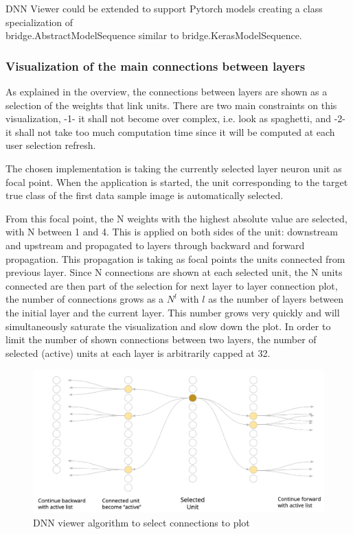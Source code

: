 DNN Viewer could be extended to support Pytorch models creating a class specialization of \\
bridge.AbstractModelSequence similar to bridge.KerasModelSequence.


\subsubsection{Visualization of the main connections between layers}
\label{sec-dnnviewer-implementation-topn-connections}

As explained in the overview, the connections between layers are shown as a selection of the weights that link units. There are two main constraints on this visualization, -1- it shall not become over complex, i.e. look as spaghetti, and -2- it shall not take too much computation time since it will be computed at each user selection refresh.

The chosen implementation is taking the currently selected layer neuron unit as focal point. When the application is started, the unit corresponding to the target true class of the first data sample image is automatically selected.

From this focal point, the N weights with the highest absolute value are selected, with N between 1 and 4. This is applied on both sides of the unit: downstream and upstream and propagated to layers through backward and forward propagation. This propagation is taking as focal points the units connected from previous layer. Since N connections are shown at each selected unit, the N units connected are then part of the selection for next layer to layer connection plot, the number of connections grows as a \(N^l\) with \(l\) as the number of layers between the initial layer and the current layer. This number grows very quickly and will simultaneously saturate the visualization and slow down the plot. In order to limit the number of shown connections between two layers, the number of selected (active) units at each layer is arbitrarily capped at 32.

\begin{figure}[H]
    \centering
    \includegraphics[scale=0.4]{images/dnn-viewer/TopNConnections.png}
    \caption{DNN viewer algorithm to select connections to plot}
    \label{fig:dnn-viewer-topn-connections}
\end{figure}


